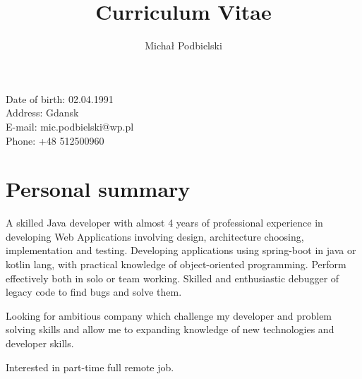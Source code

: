 \documentclass[1pt]{my_cv}
\title{\bfseries Curriculum Vitae}
\author{Michał Podbielski}
\date{}
\begin{document}
	\begin{minipage}{0.65\textwidth}
		\begingroup
		\let\center\flushleft
		\let\endcenter\endflushleft
		\maketitle
		\endgroup
	\end{minipage}
	\begin{minipage}{0.3\textwidth}
	\end{minipage}
	
	\begin{minipage}[ht]{0.48\textwidth}
		\vspace{-1cm}Date of birth: 02.04.1991\\
		Address:  Gdansk\\		
		E-mail:	mic.podbielski@wp.pl\\
		Phone: +48 512500960\\
	\end{minipage}
	
	\section*{Personal summary}	
		
		\indent A skilled Java developer with almost 4 years of professional experience in developing Web Applications involving design, architecture choosing, implementation and testing. Developing applications using spring-boot in java or kotlin lang, with practical knowledge of object-oriented programming. Perform effectively both in solo or team working. Skilled and enthusiastic debugger of legacy code to find bugs and solve them.	
		
		Looking for ambitious company which challenge my developer and problem solving skills and allow me to expanding knowledge of new technologies and developer skills.
		
		Interested in part-time full remote job. 
\end{document}
